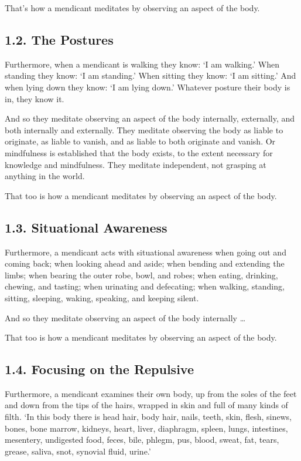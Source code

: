 \documentclass[12pt,openany]{book}%
\begin{document}
That’s how a mendicant meditates by observing an aspect of the body. 

\subsection*{1.2. The Postures }

Furthermore, when a mendicant is walking they know: ‘I am walking.’ When standing they know: ‘I am standing.’ When sitting they know: ‘I am sitting.’ And when lying down they know: ‘I am lying down.’ Whatever posture their body is in, they know it. 

And so they meditate observing an aspect of the body internally, externally, and both internally and externally. They meditate observing the body as liable to originate, as liable to vanish, and as liable to both originate and vanish. Or mindfulness is established that the body exists, to the extent necessary for knowledge and mindfulness. They meditate independent, not grasping at anything in the world. 

That too is how a mendicant meditates by observing an aspect of the body. 

\subsection*{1.3. Situational Awareness }

Furthermore, a mendicant acts with situational awareness when going out and coming back; when looking ahead and aside; when bending and extending the limbs; when bearing the outer robe, bowl, and robes; when eating, drinking, chewing, and tasting; when urinating and defecating; when walking, standing, sitting, sleeping, waking, speaking, and keeping silent. 

And so they meditate observing an aspect of the body internally … 

That too is how a mendicant meditates by observing an aspect of the body. 

\subsection*{1.4. Focusing on the Repulsive }

Furthermore, a mendicant examines their own body, up from the soles of the feet and down from the tips of the hairs, wrapped in skin and full of many kinds of filth. ‘In this body there is head hair, body hair, nails, teeth, skin, flesh, sinews, bones, bone marrow, kidneys, heart, liver, diaphragm, spleen, lungs, intestines, mesentery, undigested food, feces, bile, phlegm, pus, blood, sweat, fat, tears, grease, saliva, snot, synovial fluid, urine.’ 
\end{document}
